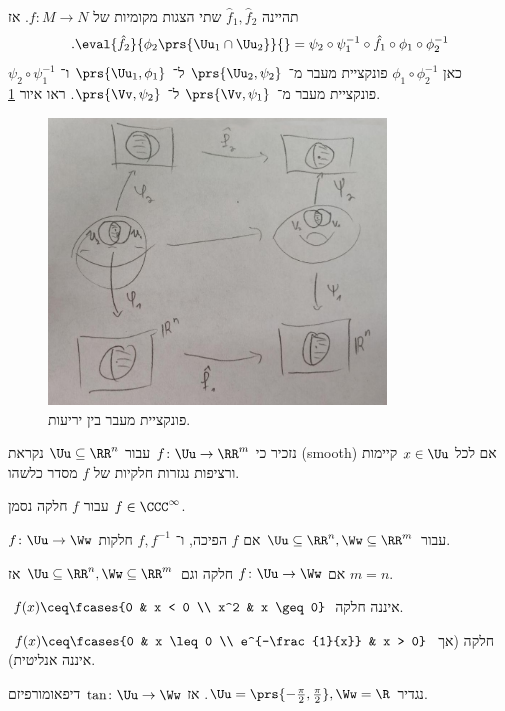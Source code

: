 \documentclass[a4paper,10pt,twoside,openany]{book}
\begin{document}
\begin{definition}
תהיינה
$\hat{f}_1, \hat{f}_2$
שתי הצגות מקומיות של
$f \colon M \to N$.
אז
\[\text{.} \eval{\hat{f}_2}{\phi_2\prs{\Uu_1 \cap \Uu_2}}{} = \psi_2 \circ \psi_1^{-1} \circ \hat{f}_1 \circ \phi_1 \circ \phi_2^{-1}\]
כאן
$\phi_1 \circ \phi_2^{-1}$
פונקציית מעבר מ־%
$\prs{\Uu_2, \psi_2}$
ל־%
$\prs{\Uu_1, \phi_1}$
ו־%
$\psi_2 \circ \psi_1^{-1}$
פונקציית מעבר מ־%
$\prs{\Vv, \psi_1}$
ל־%
$\prs{\Vv, \psi_2}$.
ראו איור
\ref{fig5}.
\begin{figure}[ht]
\centering
\caption{פונקציית מעבר בין יריעות.}
\label{fig5}
\includegraphics[width=0.8\textwidth]{sources/figure5}
\end{figure}
\end{definition}
נזכיר כי
$f \colon \Uu \to \RR^m$
עבור
$\Uu \subseteq \RR^n$
נקראת
\textenglish{(smooth)}
אם לכל
$x \in \Uu$
קיימות ורציפות נגזרות חלקיות של
$f$
מסדר כלשהו.
\begin{notation}
עבור
$f$
חלקה נסמן
$f \in \CCC^{\infty}$.
\end{notation}
\begin{definition}
$f \colon \Uu \to \Ww$
עבור
$\Uu \subseteq \RR^n, \Ww \subseteq \RR^m$
אם
$f$
הפיכה, ו־%
$f,f^{-1}$
חלקות.
\end{definition}
\begin{exercise}
אם
$f \colon \Uu \to \Ww$
חלקה וגם
$\Uu \subseteq \RR^n, \Ww \subseteq \RR^m$
אז
$m=n$.
\end{exercise}
\begin{examples}
\item $f(x) \ceq \fcases{0 & x < 0 \\ x^2 & x \geq 0}$
איננה חלקה.
\item $f(x) \ceq \fcases{0 & x \leq 0 \\ e^{-\frac{1}{x}} & x > 0}$
חלקה (אך איננה אנליטית).
\item נגדיר $\Uu = \prs{-\frac{\pi}{2}, \frac{\pi}{2}}, \Ww = \R$.
אז
$\tan \colon \Uu \to \Ww$
דיפאומורפיזם.
\end{examples}
\end{document}
